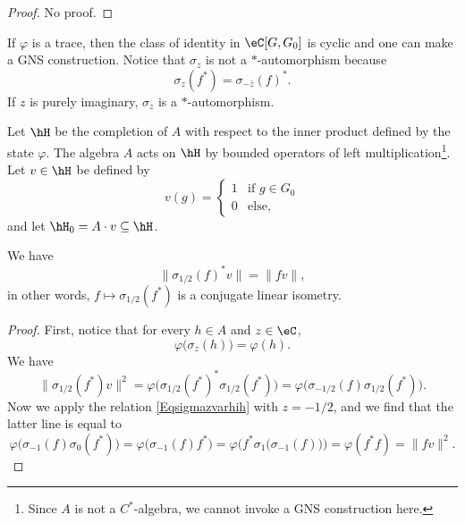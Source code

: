 \begin{proof}
No proof.
\end{proof}
If $\varphi$ is a trace, then the class of identity in $\eC[G,G_0]$ is cyclic and one can make a GNS construction. Notice that $\sigma_z$ is not a $*$-automorphism because
\begin{equation}
	\sigma_z(f^*)=\sigma_{-\bar z}(f)^*.
\end{equation}
If $z$ is purely imaginary, $\sigma_z$ is a $*$-automorphism.

Let $\hH$ be the completion of $A$ with respect to the inner product defined by the state $\varphi$. The algebra $A$ acts on $\hH$ by bounded operators of left multiplication\footnote{Since $A$ is not a $C^*$-algebra, we cannot invoke a GNS construction here.}. Let $v\in\hH$ be defined by
\begin{equation}
	v(g)=
\begin{cases}
	1&\text{if $g\in G_0$}\\
	0&\text{else},
\end{cases}
\end{equation}
and let $\hH_0=A\cdot v\subseteq\hH$.


\begin{lemma}
	We have
	\begin{equation}
		\| \sigma_{1/2}(f)^*v \|=\| fv \|,
	\end{equation}
	in other words, $f\mapsto \sigma_{1/2}(f^*)$ is a conjugate linear isometry.
\end{lemma}

\begin{proof}
	First, notice that for every $h\in A$ and $z\in \eC$,
	\begin{equation}		\label{Eqsigmazvarhih}
		\varphi\big( \sigma_z(h) \big)=\varphi(h).
	\end{equation}
	We have 
	\begin{equation}
		\| \sigma_{1/2}(f^*)v \|^2=\varphi\big( \sigma_{1/2}(f^*)^*\sigma_{1/2}(f^*) \big)=\varphi\big( \sigma_{-1/2}(f)\sigma_{1/2}(f^*) \big).
	\end{equation}
	Now we apply the relation \eqref{Eqsigmazvarhih} with $z=-1/2$, and we find that the latter line is equal to
	\begin{equation}
		\varphi\big( \sigma_{-1}(f)\sigma_0(f^*) \big)=\varphi\big( \sigma_{-1}(f)f^* \big)=\varphi\Big( f^*\sigma_1\big( \sigma_{-1}(f) \big) \Big)=\varphi(f^*f)=\| fv \|^2.
	\end{equation}
\end{proof}

